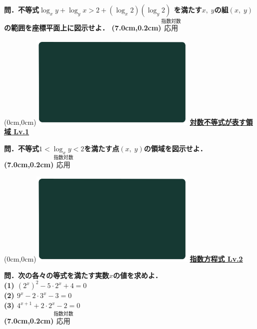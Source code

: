 \documentclass[10pt,
fleqn,
dvipdfmx,
uplatex
]{jsarticle}
\begin{document}
\Large 
\bf\boldmath 問．不等式$\log _xy+\log _yx>2+\left(\log _x2\right)\left(\log _y2\right)$
を満たす$x,\;y$の組$\left(x,\;y\right)$の範囲を座標平面上に図示せよ．
\at(7.0cm,0.2cm){\small\color{bradorange}$\overset{\text{指数対数}}{\text{応用}}$}


\newpage



\at(0cm,0cm){\includegraphics[width=8cm,bb=0 0 1920 1080]{./youtube/thumbnails/templates/smart_background/指数対数.jpeg}}
{\color{orange}\bf\boldmath\Large\underline{対数不等式が表す領域 Lv.1 }}\vspace{0.3zw}

\huge 
\bf\boldmath 問．不等式$1<\log _xy<2$を満たす点$\left(x,\;y\right)$の領域を図示せよ．
\at(7.0cm,0.2cm){\small\color{bradorange}$\overset{\text{指数対数}}{\text{応用}}$}


\newpage



\at(0cm,0cm){\includegraphics[width=8cm,bb=0 0 1920 1080]{./youtube/thumbnails/templates/smart_background/指数対数.jpeg}}
{\color{orange}\bf\boldmath\huge\underline{指数方程式 Lv.2 }}\vspace{0.3zw}

\Large 
\bf\boldmath 問．次の各々の等式を満たす実数$x$の値を求めよ．\\
(1)  $\left(2^x\right)^2-5\cdot 2^x+4=0$\\
(2)  $9^x-2\cdot 3^x-3=0$\\
(3)  $4^{x+1}+2\cdot 2^x-2=0$\\

\at(7.0cm,0.2cm){\small\color{bradorange}$\overset{\text{指数対数}}{\text{応用}}$}
\end{document}
